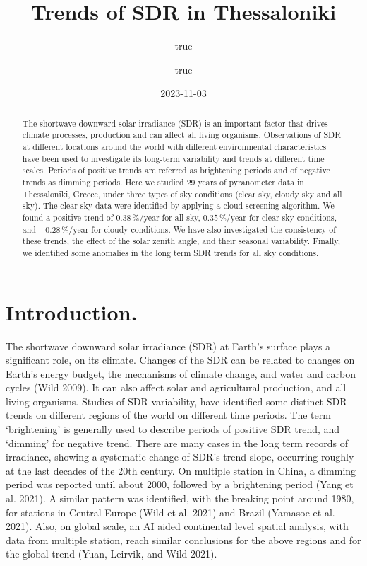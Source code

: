 \documentclass[
  preprint, 3p, authoryear]{article}
\title{Trends of SDR in Thessaloniki}
\author{true \and true}
\date{2023-11-03}
\begin{document}
\maketitle
\begin{abstract}
The shortwave downward solar irradiance (SDR) is an important factor that drives climate processes, production and can affect all living organisms.
Observations of SDR at different locations around the world with different environmental characteristics have been used to investigate its long-term variability and trends at different time scales.
Periods of positive trends are referred as brightening periods and of negative trends as dimming periods.
Here we studied 29 years of pyranometer data in Thessaloniki, Greece, under three types of sky conditions (clear sky, cloudy sky and all sky).
The clear-sky data were identified by applying a cloud screening algorithm. We found a positive trend of \(0.38\,\%/\text{year}\) for all-sky, \(0.35\,\%/\text{year}\) for clear-sky conditions, and \(-0.28\,\%/\text{year}\) for cloudy conditions.
We have also investigated the consistency of these trends, the effect of the solar zenith angle, and their seasonal variability.
Finally, we identified some anomalies in the long term SDR trends for all sky conditions.
\end{abstract}

\hypertarget{introduction.}{%
\section{Introduction.}\label{introduction.}}

The shortwave downward solar irradiance (SDR) at Earth's surface plays a significant role, on its climate.
Changes of the SDR can be related to changes on Earth's energy budget, the mechanisms of climate change, and water and carbon cycles (Wild 2009).
It can also affect solar and agricultural production, and all living organisms.
Studies of SDR variability, have identified some distinct SDR trends on different regions of the world on different time periods.
The term `brightening' is generally used to describe periods of positive SDR trend, and `dimming' for negative trend.
There are many cases in the long term records of irradiance, showing a systematic change of SDR's trend slope, occurring roughly at the last decades of the 20th century.
On multiple station in China, a dimming period was reported until about 2000, followed by a brightening period (Yang et al. 2021).
A similar pattern was identified, with the breaking point around 1980, for stations in Central Europe (Wild et al. 2021) and Brazil (Yamasoe et al. 2021).
Also, on global scale, an AI aided continental level spatial analysis, with data from multiple station, reach similar conclusions for the above regions and for the global trend (Yuan, Leirvik, and Wild 2021).
\end{document}
